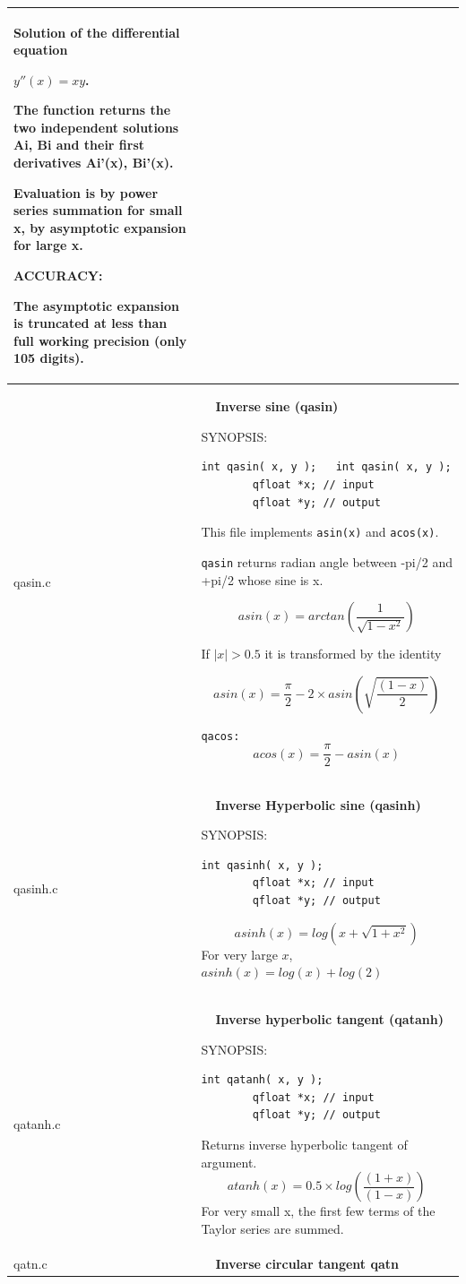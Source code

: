 \documentclass[10pt,a4paper,x11names]{memoir} %
\newcounter{entry}
\newcommand{\TOC}[1] {\addcontentsline{toc}{section}{\theentry\ \  #1} \textbf{\theentry\ \  #1} \par\stepcounter{entry}}
\begin{document}
\begin{longtable}{|p{1.5cm}|p{11.5cm}|}
	Solution of the differential equation\par
	$y''(x) = xy$.
	
	The function returns the two independent solutions Ai, Bi
	and their first derivatives Ai'(x), Bi'(x).
	
	Evaluation is by power series summation for small x, by asymptotic expansion for large x.
	
	{\footnotesize ACCURACY:}\par
	The asymptotic expansion is truncated at less than full working precision (only 105 digits).
	\\\hline
	qasin.c&\TOC{Inverse sine (qasin)}
	{\footnotesize SYNOPSIS:}\vspace{-0.2cm}\index{qasin}
	\begin{lstlisting}[numbers=none]
		int qasin( x, y );   int qasin( x, y );
		qfloat *x; // input
		qfloat *y; // output
	\end{lstlisting}\vspace{-0.2cm}
	
	This file implements \verb?asin(x)? and \verb?acos(x)?.\par
	\verb,qasin,  returns radian angle between -pi/2 and +pi/2 whose sine is x.
	
	$$asin(x) = arctan \left(\frac{1}{\sqrt{1-x^2} }\right)$$
	
	If $|x| > 0.5$ it is transformed by the identity\par
	
	$$asin(x) = \frac{\pi}{2} - 2\times asin \left(\sqrt{\frac{(1-x)}{2}}\right)$$
	
	\verb,qacos:,   $$acos(x) = \frac{\pi}{2} - asin(x)$$
	\\\hline
	qasinh.c& \TOC{Inverse Hyperbolic sine (qasinh)}
	{\footnotesize SYNOPSIS:}\vspace{-0.2cm}\index{qasinh}
	\begin{lstlisting}[numbers=none]
		int qasinh( x, y );
		qfloat *x; // input
		qfloat *y; // output
	\end{lstlisting}\vspace{-0.2cm}
	$$asinh(x) = log\left(x+\sqrt{1+x^2}\right)$$
	For very large $x$,  $asinh(x)=log(x)+log(2)$
	\\\hline
	qatanh.c & \TOC{Inverse hyperbolic tangent (qatanh)}
	
	{\footnotesize SYNOPSIS:}\vspace{-0.2cm}\index{qatanh}
	\begin{lstlisting}[numbers=none]
		int qatanh( x, y );
		qfloat *x; // input
		qfloat *y; // output
	\end{lstlisting}\vspace{-0.2cm}
	Returns inverse hyperbolic tangent of argument.
	$$atanh(x) = 0.5 \times log \left( \frac{(1+x)}{(1-x)}\right)$$
	For very small x, the first few terms of the Taylor series
	are summed.
	\\\hline
	qatn.c& \TOC{Inverse circular tangent qatn}
	

\end{longtable}
\end{document}
